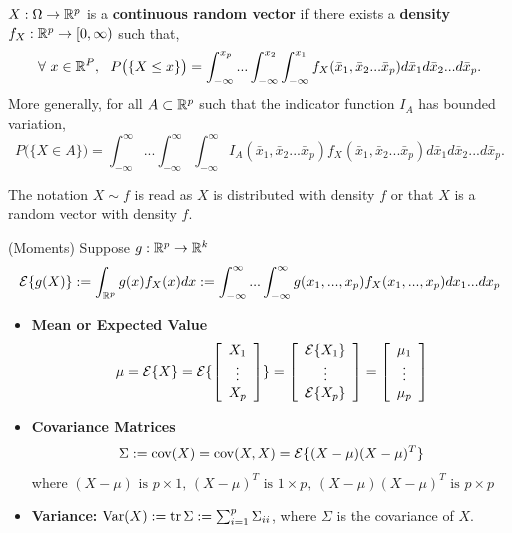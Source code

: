 \begin{definition} $X: \Omega \rightarrow \mathbb R^p$ is a \textbf{continuous random vector} if there exists a \textbf{density} $f_X:\mathbb R^p \to [0, \infty)$ such that,
 $$\forall~x\in \mathbb R^P,~~P\big(\{ X \le x\} \big)= \int_{-\infty}^{x_p} ... \int_{-\infty}^{x_2} \int_{-\infty}^{x_1}f_X(\bar{x}_1,\bar{x}_2...\bar{x}_p) d \bar{x}_1 d \bar{x}_2 ... d \bar{x}_p.$$
 More generally, for all $A\subset \mathbb R^p$ such that the indicator function $I_A$ has bounded variation,
 $$ P\big(\{ X \in A\} \big)= \int_{-\infty}^{\infty} ... \int_{-\infty}^{\infty} \int_{-\infty}^{\infty} I_A(\bar{x}_1,\bar{x}_2...\bar{x}_p) f_X(\bar{x}_1,\bar{x}_2...\bar{x}_p) d \bar{x}_1 d \bar{x}_2 ... d \bar{x}_p.$$
\end{definition} 

\begin{notation} The notation $X \sim f$ is read as $X$ is distributed with density $f$ or that $X$ is a random vector with density $f$.
\end{notation}



\begin{definition} (Moments) Suppose $g: \mathbb R^p \to \mathbb R^k$
        $$\mathcal{E}\{g(X)\}:=\int_{\mathbb R^p}g(x)f_X(x)dx:=\int_{-\infty}^{\infty}...\int_{-\infty}^{\infty}g(x_1,...,x_p)f_X(x_1,...,x_p)dx_1...dx_p$$
\begin{itemize}
    \item  \textbf{Mean or Expected Value}$$\mu=\mathcal{E}\{X\}=\mathcal{E}\{\left[ \begin{array}{ccc}X_1\\\vdots\\X_p\end{array} \right]\}=\left[ \begin{array}{ccc}\mathcal{E}\{X_1\}\\\vdots\\ \mathcal{E}\{X_p\}\end{array} \right]=
        \left[ \begin{array}{ccc}\mu_1\\\vdots\\\mu_p \end{array} \right]$$
\item 
        \textbf{Covariance Matrices}$$\Sigma:={\rm cov}(X)={\rm cov}(X,X)=\mathcal{E}\{(X-\mu)(X-\mu)^T\}$$
        where $(X-\mu) \mbox{ is }p\times 1 \mbox{, } (X-\mu)^T \mbox{ is }1\times p\mbox{, } (X-\mu)(X-\mu)^T \mbox{ is }p\times p$
        
        \item \textbf{Variance:} ${\rm Var}(X):= \operatorname*{\rm tr} \Sigma := \sum_{i=1}^{p} \Sigma_{ii}$, where $\Sigma$ is the covariance of $X$.

\end{itemize}

\end{definition}
       
